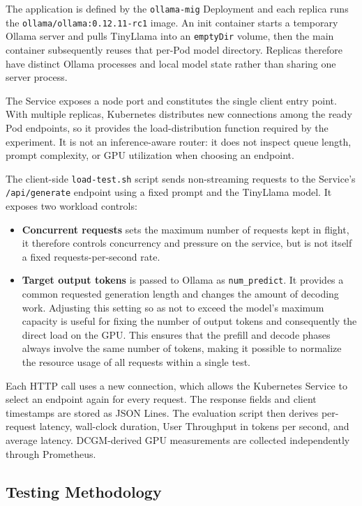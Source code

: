 The application is defined by the \texttt{ollama-mig} Deployment and each replica runs the \texttt{ollama/ollama:0.12.11-rc1} image. An init container starts a temporary Ollama server and pulls TinyLlama into an \texttt{emptyDir} volume, then the main container subsequently reuses that per-Pod model directory. Replicas therefore have distinct Ollama processes and local model state rather than sharing one server process.

The Service exposes a node port and constitutes the single client entry point. With multiple replicas, Kubernetes distributes new connections among the ready Pod endpoints, so it provides the load-distribution function required by the experiment. It is not an inference-aware router: it does not inspect queue length, prompt complexity, or GPU utilization when choosing an endpoint.

The client-side \texttt{load-test.sh} script sends non-streaming requests to the Service's \texttt{/api/generate} endpoint using a fixed prompt and the TinyLlama model. It exposes two workload controls:

\begin{itemize}
    \item \textbf{Concurrent requests} sets the maximum number of requests kept in flight, it therefore controls concurrency and pressure on the service, but is not itself a fixed requests-per-second rate.
    \item \textbf{Target output tokens} is passed to Ollama as \texttt{num\_predict}. It provides a common requested generation length and changes the amount of decoding work. Adjusting this setting so as not to exceed the model's maximum capacity is useful for fixing the number of output tokens and consequently the direct load on the GPU. This ensures that the prefill and decode phases always involve the same number of tokens, making it possible to normalize the resource usage of all requests within a single test.
\end{itemize}

Each HTTP call uses a new connection, which allows the Kubernetes Service to select an endpoint again for every request. The response fields and client timestamps are stored as JSON Lines. The evaluation script then derives per-request latency, wall-clock duration, User Throughput in tokens per second, and average latency. DCGM-derived GPU measurements are collected independently through Prometheus.

\subsection{Testing Methodology}
\label{subsec:multi-ollama-methodology}

